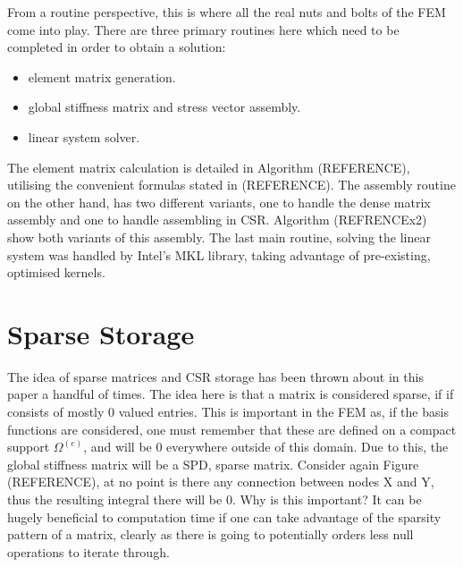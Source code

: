 From a routine perspective, this is where all the real nuts and bolts of the FEM come into play.  There are three primary routines here which need to be completed in order to obtain a solution:
\begin{itemize}
	\item element matrix generation.
	\item global stiffness matrix and stress vector assembly.
	\item linear system solver.
\end{itemize}
The element matrix calculation is detailed in Algorithm (REFERENCE), utilising the convenient formulas stated in (REFERENCE). The assembly routine on the other hand, has two different variants, one to handle the dense matrix assembly and one to handle assembling in CSR. Algorithm (REFRENCEx2) show both variants of this assembly. The last main routine, solving the linear system was handled by Intel's MKL library, taking advantage of pre-existing, optimised kernels.

\section{Sparse Storage}

The idea of sparse matrices and CSR storage has been thrown about in this paper a handful of times. The idea here is that a matrix is considered sparse, if if consists of mostly 0 valued entries. This is important in the FEM as, if the basis functions are considered, one must remember that these are defined on a compact support $\Omega^{(e)}$, and will be 0 everywhere outside of this domain. Due to this, the global stiffness matrix will be a SPD, sparse matrix. Consider again Figure (REFERENCE), at no point is there any connection between nodes X and Y, thus the resulting integral there will be 0. Why is this important? It can be hugely beneficial to computation time if one can take advantage of the sparsity pattern of a matrix, clearly as there is going to potentially orders less null operations to iterate through.

